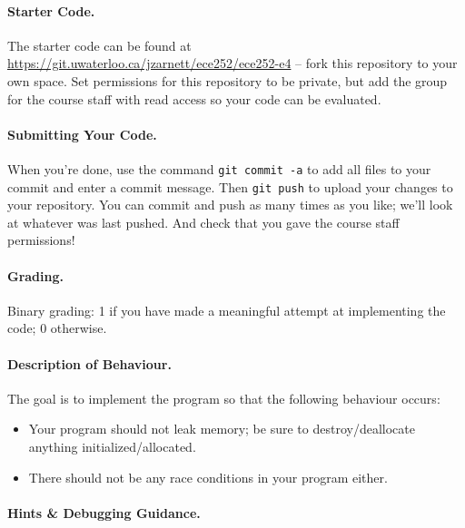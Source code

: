 \paragraph{Starter Code.} The starter code can be found at \url{https://git.uwaterloo.ca/jzarnett/ece252/ece252-e4} -- fork this repository to your own space. Set permissions for this repository to be private, but add the group for the course staff with read access so your code can be evaluated. 

\paragraph{Submitting Your Code.} When you're done, use the command \texttt{git commit -a} to add all files to your commit and enter a commit message. Then \texttt{git push} to upload your changes to your repository. You can commit and push as many times as you like; we'll look at whatever was last pushed. And check that you gave the course staff permissions!

\paragraph{Grading.} Binary grading: 1 if you have made a meaningful attempt at implementing the code; 0 otherwise.

\paragraph{Description of Behaviour.} The goal is to implement the program so that the following behaviour occurs:

\begin{itemize}

\item Your program should not leak memory; be sure to destroy/deallocate anything initialized/allocated.

\item There should not be any race conditions in your program either.
\end{itemize}


\paragraph{Hints \& Debugging Guidance.}

